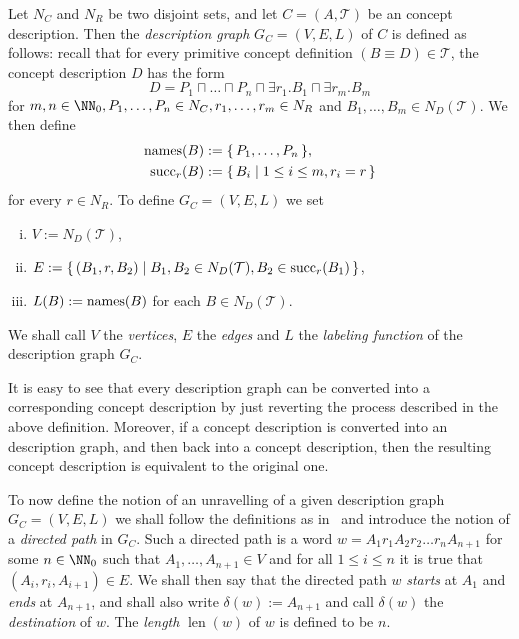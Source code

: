 \begin{Definition}
  \label{def:EL-description-graph}
  Let $N_C$ and $N_R$ be two disjoint sets, and let $C = (A, \mathcal{T})$ be an \ELgfp
  concept description.  Then the \emph{\EL description graph} $G_C = (V, E, L)$ of $C$ is
  defined as follows: recall that for every primitive concept definition $(B \equiv D) \in
  \mathcal{T}$, the concept description $D$ has the form
  \begin{equation*}
    D = P_1 \sqcap \dots \sqcap P_n \sqcap \exists r_1. B_1 \sqcap \exists r_m. B_m
  \end{equation*}
  for $m, n \in \NN_0, P_1, \dots, P_n \in N_C, r_1, \dots, r_m \in N_R$ and $B_1, \dots,
  B_m \in N_D(\mathcal{T})$.  We then define
  \begin{align*}
    \operatorname{names}(B) &:= {\{\, P_1, \dots, P_n \,\}},\\
    \operatorname{succ}_r(B) &:= {\{\, B_i \mid 1 \leq i \leq m, r_i = r \,\}}
  \end{align*}
  for every $r \in N_R$.  To define $G_C = (V, E, L)$ we set
  \begin{enumerate}[i. ]
  \item $V := N_D(\mathcal{T})$,
  \item $E := {\{\, (B_1, r, B_2) \mid B_1, B_2 \in N_D(\mathcal{T}), B_2 \in
      \operatorname{succ}_r(B_1) \,\}}$,
  \item $L(B) := \operatorname{names}(B)$ for each $B \in N_D(\mathcal{T})$.
  \end{enumerate}
  We shall call $V$ the \emph{vertices}, $E$ the \emph{edges} and $L$ the \emph{labeling
    function} of the description graph $G_C$.
\end{Definition}

It is easy to see that every \EL description graph can be converted into a corresponding
concept description by just reverting the process described in the above definition.
Moreover, if a concept description is converted into an \EL description graph, and then
back into a concept description, then the resulting concept description is equivalent to
the original one.

To now define the notion of an unravelling of a given \EL description graph $G_C = (V, E,
L)$ we shall follow the definitions as in~\cite{Diss-Felix} and introduce the notion of a
\emph{directed path} in $G_C$.  Such a directed path is a word $w = A_1 r_1 A_2 r_2 \dots
r_n A_{n+1}$ for some $n \in \NN_0$ such that $A_1, \dots, A_{n+1} \in V$ and for all $1
\leq i \leq n$ it is true that $(A_i, r_i, A_{i+1}) \in E$.  We shall then say that the
directed path $w$ \emph{starts} at $A_1$ and \emph{ends} at $A_{n+1}$, and shall also
write $\delta(w) := A_{n+1}$ and call $\delta(w)$ the \emph{destination} of $w$.  The
\emph{length} $\operatorname{len}(w)$ of $w$ is defined to be $n$.

